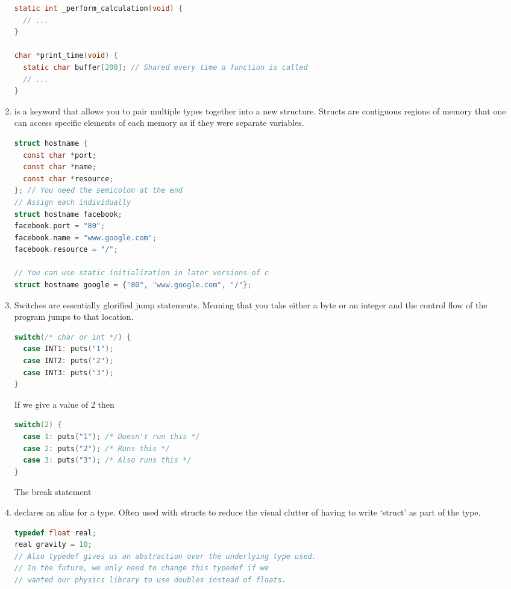 \begin{enumerate}
\begin{lstlisting}[language=C]
static int _perform_calculation(void) {
  // ...
}

char *print_time(void) {
  static char buffer[200]; // Shared every time a function is called
  // ...
}
\end{lstlisting}

	\item {} is a keyword that allows you to pair multiple types together into a new structure. Structs are contiguous regions of memory that one can access specific elements of each memory as if they were separate variables.

	      \begin{lstlisting}[language=C]
struct hostname {
  const char *port;
  const char *name;
  const char *resource;
}; // You need the semicolon at the end
// Assign each individually
struct hostname facebook;
facebook.port = "80";
facebook.name = "www.google.com";
facebook.resource = "/";

// You can use static initialization in later versions of c
struct hostname google = {"80", "www.google.com", "/"};
\end{lstlisting}


	\item {} Switches are essentially glorified jump statements. Meaning that you take either a byte or an integer and the control flow of the program jumps to that location.
	      \\
	      \begin{lstlisting}[language=C]
switch(/* char or int */) {
  case INT1: puts("1");
  case INT2: puts("2");
  case INT3: puts("3");
}
\end{lstlisting}

	      If we give a value of 2 then
	      \\
	      \begin{lstlisting}[language=C]
switch(2) {
  case 1: puts("1"); /* Doesn't run this */
  case 2: puts("2"); /* Runs this */
  case 3: puts("3"); /* Also runs this */
}
\end{lstlisting}

	      The break statement
	\item {} declares an alias for a type. Often used with structs to reduce the visual clutter of having to write `struct' as part of the type.

	      \begin{lstlisting}[language=C]
typedef float real; 
real gravity = 10;
// Also typedef gives us an abstraction over the underlying type used. 
// In the future, we only need to change this typedef if we
// wanted our physics library to use doubles instead of floats.


\end{lstlisting}
\end{enumerate}
